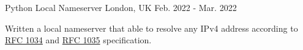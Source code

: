 \begin{cventries}
  \cventry
    {Python} %
    {Local Nameserver} %
    {London, UK} %
    {Feb. 2022 - Mar. 2022} %
    {
      \begin{cvitems} %
        \item {Written a local nameserver that able to resolve any IPv4 address according to \href{https://datatracker.ietf.org/doc/html/rfc1034}{RFC 1034} and \href{https://datatracker.ietf.org/doc/html/rfc1035}{RFC 1035} specification.}
      \end{cvitems}
    }




  



\end{cventries}
